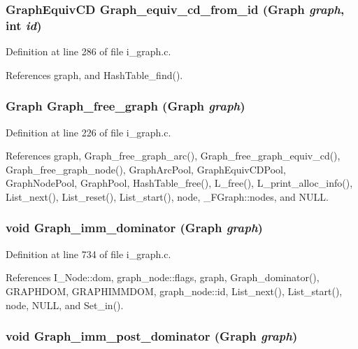 \subsubsection{\setlength{\rightskip}{0pt plus 5cm}\bf{Graph\-Equiv\-CD} Graph\_\-equiv\_\-cd\_\-from\_\-id (\bf{Graph} {\em graph}, int {\em id})}\label{i__graph_8h_5751d9f08022b1979b8bf187f0095313}




Definition at line 286 of file i\_\-graph.c.

References graph, and Hash\-Table\_\-find().
\subsubsection{\setlength{\rightskip}{0pt plus 5cm}\bf{Graph} Graph\_\-free\_\-graph (\bf{Graph} {\em graph})}\label{i__graph_8h_535bfb62fad6a432f61745f6e7ce591b}




Definition at line 226 of file i\_\-graph.c.

References graph, Graph\_\-free\_\-graph\_\-arc(), Graph\_\-free\_\-graph\_\-equiv\_\-cd(), Graph\_\-free\_\-graph\_\-node(), Graph\-Arc\-Pool, Graph\-Equiv\-CDPool, Graph\-Node\-Pool, Graph\-Pool, Hash\-Table\_\-free(), L\_\-free(), L\_\-print\_\-alloc\_\-info(), List\_\-next(), List\_\-reset(), List\_\-start(), node, \_\-FGraph::nodes, and NULL.
\subsubsection{\setlength{\rightskip}{0pt plus 5cm}void Graph\_\-imm\_\-dominator (\bf{Graph} {\em graph})}\label{i__graph_8h_5b524304b2f42cecc80184a412c861cf}




Definition at line 734 of file i\_\-graph.c.

References I\_\-Node::dom, graph\_\-node::flags, graph, Graph\_\-dominator(), GRAPHDOM, GRAPHIMMDOM, graph\_\-node::id, List\_\-next(), List\_\-start(), node, NULL, and Set\_\-in().
\subsubsection{\setlength{\rightskip}{0pt plus 5cm}void Graph\_\-imm\_\-post\_\-dominator (\bf{Graph} {\em graph})}\label{i__graph_8h_61c52032649a28da1dacf08a943c9b83}




